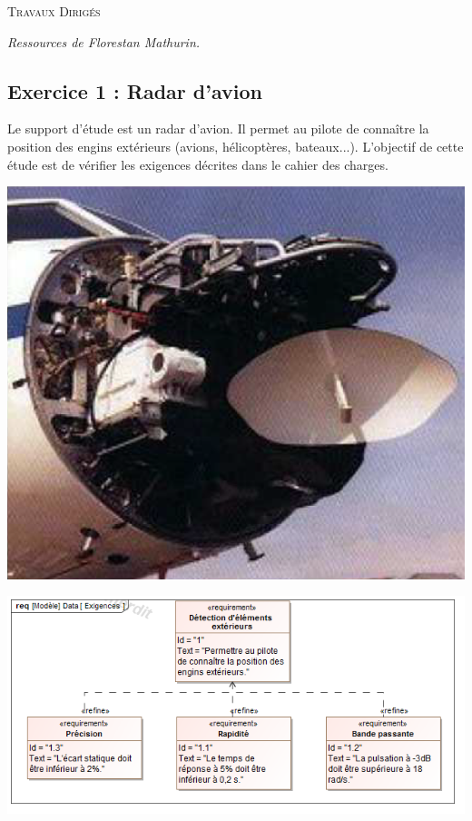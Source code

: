 \documentclass[10pt]{article}
\begin{document}
\begin{center}
\large{\textsc{Travaux Dirigés}}
\end{center}

\begin{flushright}
\textit{Ressources de Florestan Mathurin.}
\end{flushright}

 \renewcommand{\baselinestretch}{1.2}
\setlength{\parskip}{2ex plus 0.5ex minus 0.2ex}

\subsection*{Exercice 1 : Radar d'avion}

\begin{minipage}[c]{.78\linewidth}
Le support d'étude est un radar d'avion. Il permet au pilote de connaître la position des engins extérieurs (avions, hélicoptères, bateaux...). L'objectif de cette étude est de vérifier les exigences décrites dans le cahier des charges. 
\end{minipage} \hfill
\begin{minipage}[c]{.18\linewidth}
\begin{center}
\includegraphics[width=.95\textwidth]{images/exo1_1}
\end{center}
\end{minipage}


\begin{center}
\includegraphics[width=.8\textwidth]{images/ExigencesRadar}
\end{center}
\end{document}
